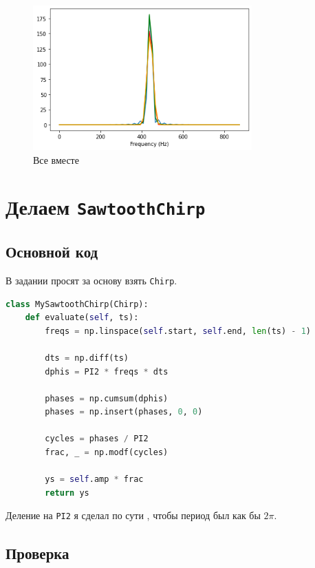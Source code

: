 \documentclass[a4paper,12pt]{report}
\begin{document}
    \begin{figure}[H]
        \centering
        \includegraphics[width=0.75\textwidth]{ex1_testing.png}
        \caption{Все вместе}
        \label{fig:ex1_testing}
    \end{figure}
    
    \chapter{Делаем \texttt{SawtoothChirp}}
    
    \section{Основной код}
    
    В задании просят за основу взять \texttt{Chirp}.
    
\begin{lstlisting}[language=Python,caption=Реализация своего пилообразного \texttt{Chirp}'а]
class MySawtoothChirp(Chirp):
    def evaluate(self, ts):
        freqs = np.linspace(self.start, self.end, len(ts) - 1)
        
        dts = np.diff(ts)
        dphis = PI2 * freqs * dts
        
        phases = np.cumsum(dphis)
        phases = np.insert(phases, 0, 0)
        
        cycles = phases / PI2
        frac, _ = np.modf(cycles)

        ys = self.amp * frac
        return ys
\end{lstlisting}

    Деление на \texttt{PI2} я сделал по сути , чтобы период был как бы $2\pi$.

    \section{Проверка}
\end{document}
